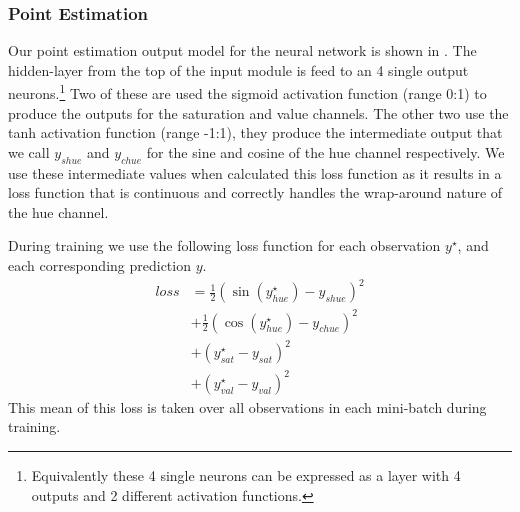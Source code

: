 \documentclass[11pt,a4paper]{article}
\begin{document}
\subsubsection{Point Estimation}
Our point estimation output model for the neural network is shown in .
The hidden-layer from the top of the input module is feed to an 4 single output neurons.\footnote{Equivalently these 4 single neurons can be expressed as a layer with 4 outputs and 2 different activation functions.}
Two of these are used the sigmoid activation function (range 0:1) to produce the outputs for the saturation and value channels.
The other two use the tanh activation function (range -1:1), they produce the intermediate output that we call $y_{shue}$ and $y_{chue}$ for the sine and cosine of the hue channel respectively.
We use these intermediate values when calculated this loss function as it results in a loss function that is continuous and correctly handles the wrap-around nature of the hue channel.

During training we use the following loss function for each observation $y^\star$, and each corresponding prediction $y$.
\begin{align}
loss &= %
\frac{1}{2} \left(\sin(y^\star_{hue}) - y_{shue} \right)^2  \\
&+ \frac{1}{2} \left(\cos(y^\star_{hue}) - y_{chue} \right)^2  \\
&+ \left(y^\star_{sat} - y_{sat} \right)^2 \\
&+ \left(y^\star_{val} - y_{val} \right)^2 %
\end{align}
This mean of this loss is taken over all observations in each mini-batch during training.
\end{document}
